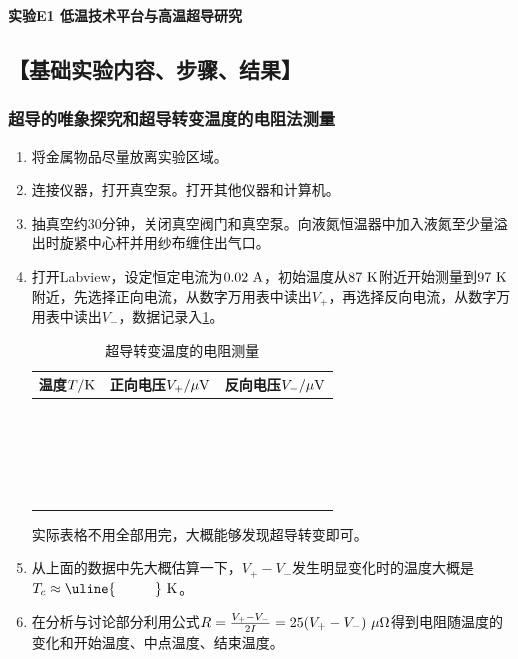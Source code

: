 \documentclass[11pt,a4paper]{ctexart}
\newcommand{\ExpeName}{实验E1 低温技术平台与高温超导研究}
\newcommand{\unit}[1]{\rm \ #1}
\begin{document}
\begin{center}
\LARGE{\textbf{\ExpeName}}
\end{center}
\subsection{【基础实验内容、步骤、结果】}

\subsubsection{超导的唯象探究和超导转变温度的电阻法测量}
\begin{enumerate}
\item
将金属物品尽量放离实验区域。
\item
连接仪器，打开真空泵。打开其他仪器和计算机。
\item
抽真空约30分钟，关闭真空阀门和真空泵。向液氮恒温器中加入液氮至少量溢出时旋紧中心杆并用纱布缠住出气口。
\item
打开Labview，设定恒定电流为$0.02\unit{A}$，初始温度从$87\unit{K}$附近开始测量到$97\unit{K}$附近，先选择正向电流，从数字万用表中读出$V_+$，再选择反向电流，从数字万用表中读出$V_-$，数据记录入\cref{table1}。
\begin{table}[H]
\centering
\caption{超导转变温度的电阻测量\label{table1}}
\begin{tabular}{|p{32mm}|p{32mm}|p{32mm}|}
\hline
温度$T/{\rm K}$ & 正向电压$V_+/{\rm \mu V}$ & 反向电压$V_-/{\rm \mu V}$ \\ \hline
 & & \\ \hline
  & & \\ \hline
  & & \\ \hline
   & & \\ \hline
    & & \\ \hline
 & & \\ \hline
  &  &\\ \hline
  &  &\\ \hline
  &  &\\ \hline
  &  &\\ \hline
  &  &\\ \hline
  &  &\\ \hline
  &  &\\ \hline
  &  &\\ \hline
  &  &\\ \hline
  &  &\\ \hline
  &  &\\ \hline
  &  &\\ \hline
    & &\\ \hline
  & &\\ \hline
   & &\\ \hline
  \end{tabular}
  \end{table}
 实际表格不用全部用完，大概能够发现超导转变即可。
 \item
 从上面的数据中先大概估算一下，$V_+-V_-$发生明显变化时的温度大概是$T_c \approx \uline{\hspace{10mm}} \unit{K}$。
 \item
 在分析与讨论部分利用公式$R = \frac{V_+-V_-}{2I} = 25(V_+-V_-)\unit{\mu \Omega}$得到电阻随温度的变化和开始温度、中点温度、结束温度。
  

\end{enumerate}
\end{document}
